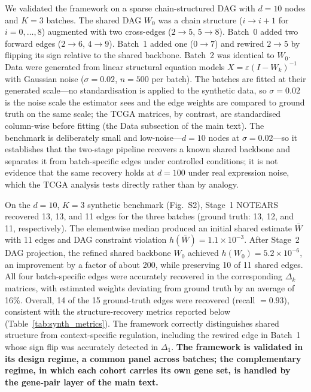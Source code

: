 \documentclass[11pt]{article}
\begin{document}
We validated the framework on a sparse chain-structured DAG with $d=10$ nodes and $K=3$ batches. The shared DAG $W_0$ was a chain structure ($i \to i+1$ for $i=0,\dots,8$) augmented with two cross-edges ($2 \to 5$, $5 \to 8$). Batch~0 added two forward edges ($2 \to 6$, $4 \to 9$). Batch~1 added one ($0 \to 7$) and rewired $2 \to 5$ by flipping its sign relative to the shared backbone. Batch~2 was identical to $W_0$. Data were generated from linear structural equation models $X = \varepsilon (I - W_k)^{-1}$ with Gaussian noise ($\sigma = 0.02$, $n = 500$ per batch). The batches are fitted at their generated scale---no standardisation is applied to the synthetic data, so $\sigma = 0.02$ is the noise scale the estimator sees and the edge weights are compared to ground truth on the same scale; the TCGA matrices, by contrast, are standardised column-wise before fitting (the Data subsection of the main text). The benchmark is deliberately small and low-noise---$d = 10$ nodes at $\sigma = 0.02$---so it establishes that the two-stage pipeline recovers a known shared backbone and separates it from batch-specific edges under controlled conditions; it is not evidence that the same recovery holds at $d = 100$ under real expression noise, which the TCGA analysis tests directly rather than by analogy.

On the $d=10$, $K=3$ synthetic benchmark (Fig.~S2), Stage~1 NOTEARS recovered 13, 13, and 11 edges for the three batches (ground truth: 13, 12, and 11, respectively). The elementwise median produced an initial shared estimate $\bar{W}$ with 11 edges and DAG constraint violation $h(\bar{W}) = 1.1 \times 10^{-3}$. After Stage~2 DAG projection, the refined shared backbone $W_0$ achieved $h(W_0) = 5.2 \times 10^{-6}$, an improvement by a factor of about 200, while preserving 10 of 11 shared edges. All four batch-specific edges were accurately recovered in the corresponding $\Delta_k$ matrices, with estimated weights deviating from ground truth by an average of 16\%. Overall, 14 of the 15 ground-truth edges were recovered (recall $= 0.93$), consistent with the structure-recovery metrics reported below (Table~\ref{tab:synth_metrics}). The framework correctly distinguishes shared structure from context-specific regulation, including the rewired edge in Batch~1 whose sign flip was accurately detected in $\Delta_1$. \textbf{The framework is validated in its design regime, a common panel across batches; the complementary regime, in which each cohort carries its own gene set, is handled by the gene-pair layer of the main text.}
\end{document}
